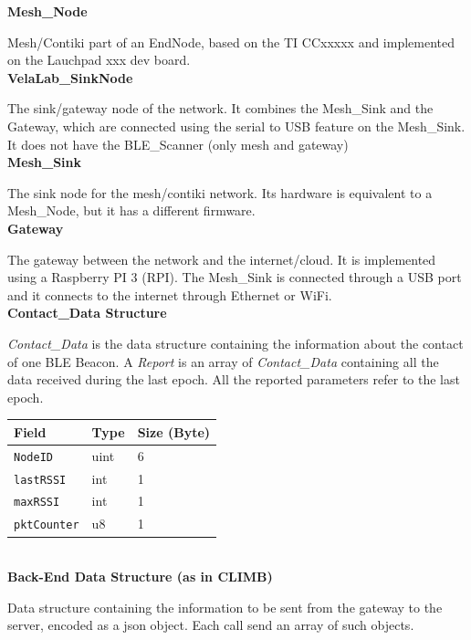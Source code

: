 \documentclass[12pt]{article}
\begin{document}
\noindent \textbf{Mesh\_Node}

Mesh/Contiki part of an EndNode, based on the TI CCxxxxx and implemented on the Lauchpad xxx dev board.
\\

\noindent \textbf{VelaLab\_SinkNode}

The sink/gateway node of the network. It combines the Mesh\_Sink and the Gateway, which are connected using the serial to USB feature on the Mesh\_Sink. It does not have the BLE\_Scanner (only mesh and gateway)
\\

\noindent \textbf{Mesh\_Sink}

The sink node for the mesh/contiki network. Its hardware is equivalent to a Mesh\_Node, but it has a different firmware.
\\

\noindent \textbf{Gateway}

The gateway between the network and the internet/cloud. It is implemented using a Raspberry PI 3 (RPI). The Mesh\_Sink is connected through a USB port and it connects to the internet through Ethernet or WiFi.
\\

\noindent \textbf{Contact\_Data Structure}

\textit{Contact\_Data} is the data structure containing the information about the contact of one BLE Beacon. A \textit{Report} is an array of \textit{Contact\_Data} containing all the data received during the last epoch. All the reported parameters refer to the last epoch.
\\

\begin{tabular}{l|l|l}
Field 		& Type 		& Size (Byte)\\
\hline
\texttt{NodeID} 		& uint		& 6\\
\texttt{lastRSSI} 		& int			& 1\\
\texttt{maxRSSI} 		& int			& 1\\
\texttt{pktCounter} 	& u8			& 1\\
\end{tabular}
\\

\noindent \textbf{Back-End Data Structure (as in CLIMB)}

Data structure containing the information to be sent from the gateway to the server, encoded as a json object. Each call send an array of such objects.
\\
\end{document}

